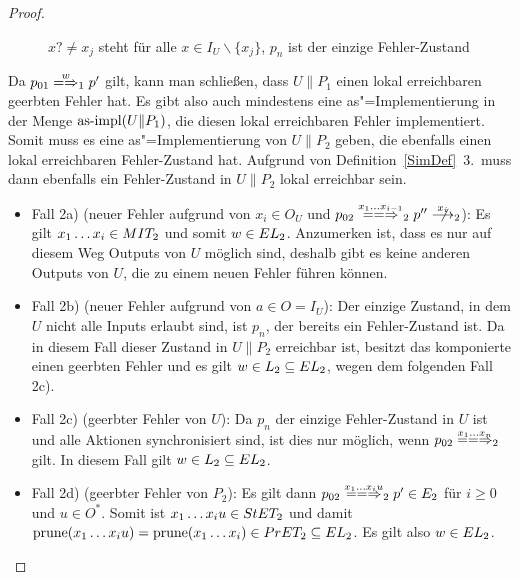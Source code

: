 \begin{proof}
\begin{itemize}
\begin{figure} [h!tbp]
\begin{center}
        \caption{$x?\neq x_j$ steht für alle $x\in I_U\backslash\{x_j\}$, $p_n$
          ist der einzige Fehler-Zustand}
      \label{UmitE}
      \end{center}
      \end{figure}
      Da $p_{01}\weakmay[w]_1p'$ gilt, kann man schließen, dass $U\|P_1$ einen
      lokal erreichbaren geerbten Fehler hat. Es gibt also auch mindestens eine
      as"=Implementierung in der Menge $\mathrm{as}\text{-}\mathrm{impl} (U\|P_1)$, die diesen lokal
      erreichbaren Fehler implementiert. Somit muss es eine as"=Implementierung
      von $U\|P_2$ geben, die ebenfalls einen lokal erreichbaren Fehler-Zustand
      hat. Aufgrund von Definition~\ref{SimDef}~3.\ muss dann ebenfalls ein
      Fehler-Zustand in $U\|P_2$ lokal erreichbar sein.
      \begin{itemize}
        \item Fall 2a) (neuer Fehler aufgrund von $x_i\in O_U$ und $p_{02}
          \lweakmay[x_1\dots x_{i-1}]_2p''\nmust[x_i]_2$): Es gilt $x_1\dots
          x_i\in MIT _2$ und somit $w\in EL_2$. Anzumerken ist, dass es nur
          auf diesem Weg Outputs von $U$ möglich sind, deshalb gibt es keine
          anderen Outputs von $U$, die zu einem neuen Fehler führen können.
        \item Fall 2b) (neuer Fehler aufgrund von $a\in O=I_U$): Der einzige
          Zustand, in dem $U$ nicht alle Inputs erlaubt sind, ist $p_n$, der
          bereits ein Fehler-Zustand ist. Da in diesem Fall dieser Zustand in
          $U\|P_2$ erreichbar ist, besitzt das komponierte \MEIO{} einen
          geerbten Fehler und es gilt $w\in L_2\subseteq EL _2$, wegen dem
          folgenden Fall 2c).
        \item Fall 2c) (geerbter Fehler von $U$): Da $p_n$ der einzige
          Fehler-Zustand in $U$ ist und alle Aktionen synchronisiert sind, ist
          dies nur möglich, wenn $p_{02} \lweakmay[x_1\dots x_n]_2$ gilt. In
          diesem Fall gilt $w\in L_2\subseteq EL _2$.
        \item Fall 2d) (geerbter Fehler von $P_2$): Es gilt dann $p_{02}
          \lweakmay[x_1\dots x_iu]_2 p'\in E_2$ für $i\geq 0$ und $u\in O^*$.
          Somit ist $x_1\dots x_iu\in StET _2$ und damit $\mathrm{prune} (x_1\dots
          x_iu) =\mathrm{prune} (x_1\dots x_i)\in PrET _2\subseteq EL _2$. Es gilt
          also $w\in EL _2$.
      \end{itemize}
  \end{itemize}
\end{proof}

